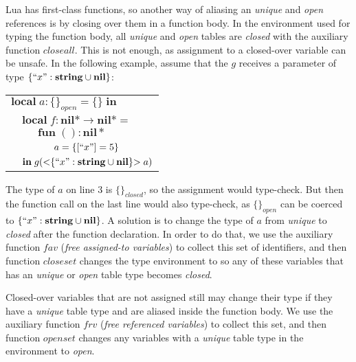 \documentclass{sigplanconf}
\newcommand{\Nil}{\mathbf{nil}}
\newcommand{\String}{\mathbf{string}}
\newcommand{\Void}{\Nil{*}}
\begin{document}
Lua has first-class functions, so another way of aliasing
an {\em unique} and {\em open} references is by closing
over them in a function body. In the environment used for
typing the function body, all {\em unique} and {\em open}
tables are {\em closed} with the auxiliary function $closeall$.
This is not enough, as assignment
to a closed-over variable can be unsafe. In the following
example, assume that the $g$ receives a parameter of type
$\{ ``x": \String \cup \Nil\}$:
\begin{center}
	\begin{tabular}{llll}
		\multicolumn{4}{l}{$\mathbf{local} \; a:\{\}_{open}
			= \{\} \; \mathbf{in}$}\\
		& \multicolumn{3}{l}{$\mathbf{local} \; f:\Void \rightarrow \Void =$}\\
		& & \multicolumn{2}{l}{$\mathbf{fun} \; ():\Void$}\\
		& & & \multicolumn{1}{l}{$a = \{[``x"]=5\} $}\\
		& \multicolumn{3}{l}{$\mathbf{in} \; g({<}\{``x":
			 \String \cup \Nil\}{>} \; a)$}
	\end{tabular}
\end{center}

The type of $a$ on line 3 is $\{\}_{closed}$, so the assignment
would type-check. But then the function call on the last line
would also type-check, as $\{\}_{open}$ can be coerced to
$\{ ``x": \String \cup \Nil\}$. A solution is to change the
type of $a$ from {\em unique} to {\em closed} after the function
declaration. In order to do that, we use the auxiliary function
$fav$ ({\em free assigned-to variables}) to collect this
set of identifiers, and then function $closeset$ changes
the type environment to so any of these variables that
has an {\em unique} or {\em open} table type becomes {\em closed}.

Closed-over variables that are not assigned still may
change their type if they have a {\em unique} table type
and are aliased inside the function body. We use the auxiliary
function $frv$ ({\em free referenced variables}) to collect
this set, and then function $openset$ changes any variables
with a {\em unique} table type in the environment to {\em open}.
\end{document}
